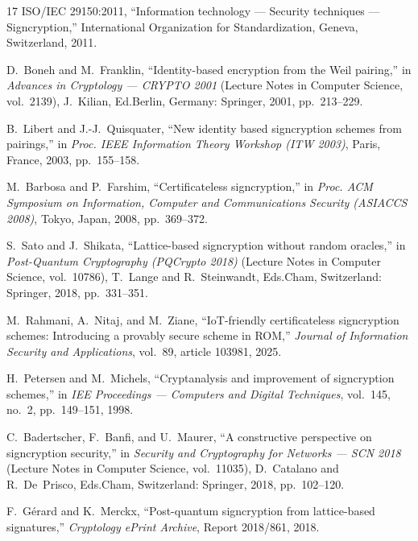 \documentclass[11pt,a4paper]{article}
\begin{document}
\begin{thebibliography}{17}
ISO/IEC 29150:2011, ``Information technology --- Security techniques --- Signcryption,'' International Organization for Standardization, Geneva, Switzerland, 2011.

D.~Boneh and M.~Franklin, ``Identity-based encryption from the Weil pairing,'' in \textit{Advances in Cryptology --- CRYPTO 2001} (Lecture Notes in Computer Science, vol.~2139), J.~Kilian, Ed.\hspace{1em}Berlin, Germany: Springer, 2001, pp.~213--229.

B.~Libert and J.-J.~Quisquater, ``New identity based signcryption schemes from pairings,'' in \textit{Proc. IEEE Information Theory Workshop (ITW 2003)}, Paris, France, 2003, pp.~155--158.

M.~Barbosa and P.~Farshim, ``Certificateless signcryption,'' in \textit{Proc. ACM Symposium on Information, Computer and Communications Security (ASIACCS 2008)}, Tokyo, Japan, 2008, pp.~369--372.

S.~Sato and J.~Shikata, ``Lattice-based signcryption without random oracles,'' in \textit{Post-Quantum Cryptography (PQCrypto 2018)} (Lecture Notes in Computer Science, vol.~10786), T.~Lange and R.~Steinwandt, Eds.\hspace{1em}Cham, Switzerland: Springer, 2018, pp.~331--351.

M.~Rahmani, A.~Nitaj, and M.~Ziane, ``IoT-friendly certificateless signcryption schemes: Introducing a provably secure scheme in ROM,'' \textit{Journal of Information Security and Applications}, vol.~89, article 103981, 2025.

H.~Petersen and M.~Michels, ``Cryptanalysis and improvement of signcryption schemes,'' in \textit{IEE Proceedings --- Computers and Digital Techniques}, vol.~145, no.~2, pp.~149--151, 1998.

C.~Badertscher, F.~Banfi, and U.~Maurer, ``A constructive perspective on signcryption security,'' in \textit{Security and Cryptography for Networks --- SCN 2018} (Lecture Notes in Computer Science, vol.~11035), D.~Catalano and R.~De~Prisco, Eds.\hspace{1em}Cham, Switzerland: Springer, 2018, pp.~102--120.

F.~G\'{e}rard and K.~Merckx, ``Post-quantum signcryption from lattice-based signatures,'' \textit{Cryptology ePrint Archive}, Report 2018/861, 2018.

\end{thebibliography}
\end{document}
